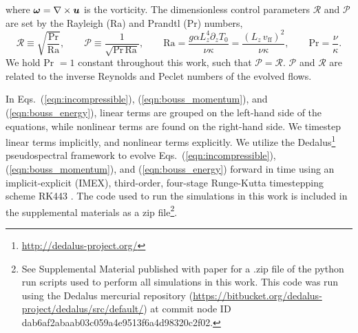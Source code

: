 where $\bm{\omega} = \nabla \times \bm{u}$ is the vorticity.
The dimensionless control parameters $\mathcal{R}$ and $\mathcal{P}$ 
are set by the Rayleigh (Ra) and Prandtl (Pr) numbers,
\begin{equation}
\mathcal{R} \equiv \sqrt{\frac{\text{Pr}}{\text{Ra}}}, \qquad \mathcal{P} \equiv \frac{1}{\sqrt{\text{Pr}\,\text{Ra}}}, \qquad
\text{Ra} = \frac{g \alpha L_z^4 \partial_z T_0}{\nu\kappa} = \frac{(L_z\,v_{\text{ff}})^2}{\nu\kappa}, \qquad \text{Pr} = \frac{\nu}{\kappa}.
\end{equation}
We hold Pr $= 1$ constant throughout this work, such that $\mathcal{P} = \mathcal{R}$.
$\mathcal{P}$ and $\mathcal{R}$ are related to the inverse Reynolds and Peclet numbers of the
evolved flows.

In Eqs.~(\ref{eqn:incompressible}), (\ref{eqn:bouss_momentum}), and (\ref{eqn:bouss_energy}),
linear terms are grouped on the left-hand side of the equations, while nonlinear terms
are found on the right-hand side. We timestep linear terms implicitly, and nonlinear
terms explicitly.
We utilize the 
Dedalus\footnote{\url{http://dedalus-project.org/}} 
pseudospectral framework \cite{burns&all2016} to evolve  
Eqs.~(\ref{eqn:incompressible}), (\ref{eqn:bouss_momentum}), and (\ref{eqn:bouss_energy}) 
forward in time
using an implicit-explicit (IMEX), third-order, four-stage 
Runge-Kutta timestepping scheme RK443 \cite{ascher&all1997}. The code used to run the simulations
in this work is included in the supplemental materials as a zip file\footnote{See Supplemental Material published with paper for a .zip file of the python run scripts used to perform all simulations in this work. This code was run using the Dedalus mercurial repository (\url{https://bitbucket.org/dedalus-project/dedalus/src/default/}) at commit node ID dab6af2abaab03c059a4e9513f6a4d98320c2f02.}.

